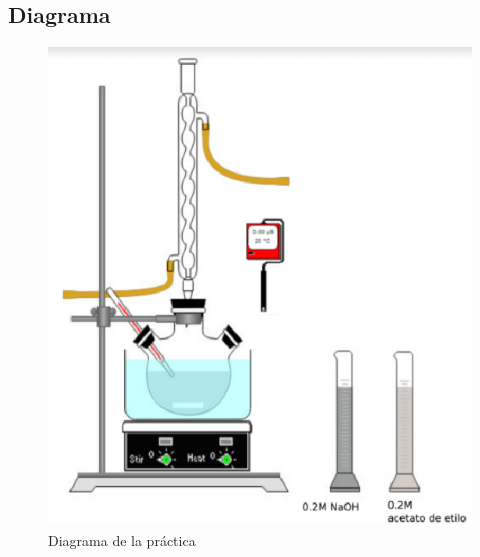     \subsection{Diagrama}
        \begin{figure}[H]
            \centering
            \includegraphics[scale=0.7]{Figuras/Diagrama.eps}
            \caption{Diagrama de la práctica}
        \end{figure}
